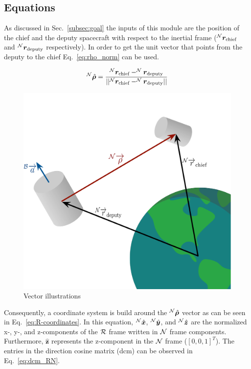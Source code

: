 \documentclass[]{AVSreport}
\begin{document}
\subsection{Equations}

As discussed in Sec.~\ref{subsec:goal} the inputs of this module are the position of the chief and the deputy spacecraft with respect to the inertial frame ($^{\cal N}{\bm r}_{\textrm{chief}}$ and $^{\cal N}{\bm r}_{\textrm{deputy}}$ respectively). In order to get the unit vector that points from the deputy to the chief Eq.~\eqref{eq:rho_norm} can be used.

\begin{equation}
    ^{\cal N}\hat{{\bm \rho}} = \frac{^{\cal N}{\bm r}_{\textrm{chief}} - ^{\cal N}{\bm r}_{\textrm{deputy}}}{||^{\cal N}{\bm r}_{\textrm{chief}} - ^{\cal N}{\bm r}_{\textrm{deputy}}||}
    \label{eq:rho_norm}
\end{equation}

\begin{figure}[htb]
	\centerline{
	\includegraphics[scale=0.52]{Figures/relativePointing.pdf}
	}
	\caption{Vector illustrations}
	\label{fig:rel_point}
\end{figure}

Consequently, a coordinate system is build around the $^{\cal N}\hat{{\bm \rho}}$ vector as can be seen in Eq.~\eqref{eq:R-coordinates}. In this equation, ${^{\cal N}\hat{{\bm x}}}$, ${^{\cal N}\hat{{\bm y}}}$, and ${^{\cal N}\hat{{\bm z}}}$ are the normalized x-, y-, and z-components of the $\cal R$ frame written in $\cal N$ frame components. Furthermore, ${\hat{\bm z}}$ represents the z-component in the $\cal N$ frame ($[0,0,1]^{T}$). The entries in the direction cosine matrix (dcm) can be observed in Eq.~\eqref{eq:dcm_RN}. 
\end{document}
